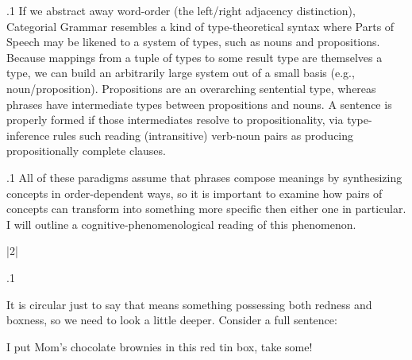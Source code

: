 \documentclass[11pt, twocolumn]{article}
\begin{document}
\p.1{%
If we abstract away word-order (the left/right adjacency distinction),
Categorial Grammar resembles a kind of type-theoretical syntax
where Parts of Speech may be likened to a system of types,
such as nouns and propositions.  Because mappings from a tuple
of types to some result type are themselves a type,
we can build an arbitrarily large system
out of a small basis (e.g., noun/proposition).
Propositions are an overarching sentential type,
whereas phrases have intermediate types between propositions
and nouns.  A sentence is properly
formed if those intermediates resolve to propositionality,
via type-inference rules such reading (intransitive) verb-noun
pairs as producing propositionally complete clauses.
} %

\p.1{%
All of these paradigms assume that phrases compose
meanings by synthesizing concepts in order-dependent
ways, so it is important to examine how pairs of
concepts can transform into something more specific
then either one in particular.  I will outline a
cognitive-phenomenological reading of this phenomenon.
} %


\s|2|{}

\p.1{%
It is circular just
to say that  means something possessing
both redness and boxness, so we need to look a
little deeper.  Consider a full sentence:

\begin{exsGroup}

\exsItem{}   I put Mom's chocolate brownies in this red tin box, take some!

\end{exsGroup}

} %
\end{document}
